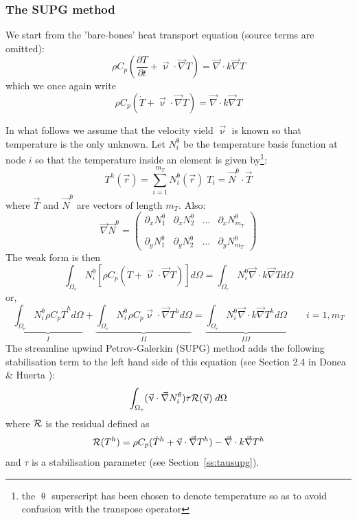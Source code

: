 \newpage
\subsubsection{The SUPG method}

We start from the 'bare-bones' heat transport equation (source terms are omitted): 
\begin{equation}
\rho C_p \left( \frac{\partial T}{\partial t} + {\vec \upnu}\cdot {\vec\nabla T} \right)
= {\vec \nabla} \cdot k \vec\nabla T 
\end{equation}
which we once again write 
\begin{equation}
\rho C_p \left(\dot{T} + {\vec \upnu}\cdot {\vec\nabla T} \right)
= {\vec \nabla} \cdot k \vec\nabla T 
\end{equation}

In what follows we assume that the velocity vield $\vec \upnu$ is known so that temperature is the
only unknown.
Let $N^\uptheta_i$ be the temperature basis function at node $i$ so that the temperature inside an element is
given by\footnote{the $\uptheta$ superscript has been chosen to denote temperature so as to avoid confusion
with the transpose operator}:
\begin{equation}
T^h({\vec r}) = \sum_{i=1}^{m_T} N^\uptheta_i ({\vec r})\;  T_i = \vec N^\uptheta \cdot \vec T
\end{equation}
where $\vec T$ and $\vec N^\uptheta$ are vectors of length $m_T$. Also:
\[
\vec \nabla \vec N^\uptheta = 
\left(
\begin{array}{cccc}
\partial_x N_1^\uptheta & 
\partial_x N_2^\uptheta & \dots &
\partial_x N_{m_T}^\uptheta \\ \\
\partial_y N_1^\uptheta & 
\partial_y N_2^\uptheta & \dots &
\partial_y N_{m_T}^\uptheta 
\end{array}
\right)
\]
The weak form is then
\begin{equation}
\int_{\Omega_e} N^\uptheta_i \left[ 
\rho C_p \left( \dot{T} + {\vec \upnu}\cdot {\vec\nabla T} \right) \right] d\Omega
= \int_{\Omega_e}  N^\uptheta_i {\vec \nabla} \cdot k \vec\nabla T  d\Omega
\end{equation}
or,
\[
\underbrace{\int_{\Omega_e} N^\uptheta_i  \rho C_p \dot{T}^h d\Omega}_{I}
+ \underbrace{\int_{\Omega_e} N^\uptheta_i  \rho C_p  {\vec \upnu}\cdot {\vec\nabla T^h}   d\Omega}_{II}
= \underbrace{\int_{\Omega_e}  N^\uptheta_i {\vec \nabla} \cdot k \vec\nabla T^h d\Omega}_{III}
\quad\quad
i=1,m_T
\]
The streamline upwind Petrov-Galerkin (SUPG) 
method adds the following stabilisation term to the left hand side of this equation (see Section 2.4 
in Donea \& Huerta \cite{dohu03}):
\[
\int_{\Omega_e} (\vec\upnu\cdot\vec\nabla N_i^\theta ) \tau {\cal R}(\vec\upnu) \; d\Omega
\]
where ${\cal R}$ is the residual defined as
\[
{\cal R}(T^h) = 
\rho C_p (\dot{T}^h +  {\vec \upnu}\cdot {\vec\nabla T^h}) - {\vec \nabla} \cdot k \vec\nabla T^h 
\]
and $\tau$ is a stabilisation parameter (see Section~\ref{ss:tausupg}).

